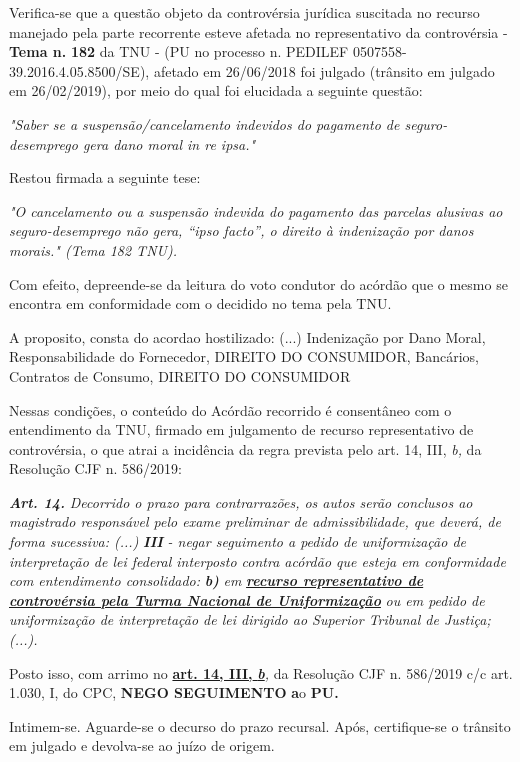 \documentclass[12pt]{article}
\begin{document}
\justifying
\noindent Verifica-se que a questão objeto da controvérsia jurídica suscitada no recurso manejado pela parte recorrente esteve afetada no representativo da controvérsia - \textbf{Tema n. }\textbf{182} da TNU - (PU no processo n. PEDILEF 0507558-39.2016.4.05.8500/SE),  afetado em 26/06/2018 foi julgado (trânsito em julgado em 26/02/2019), por meio do qual foi elucidada a seguinte questão:

\noindent \textit{"Saber se a suspensão/cancelamento indevidos do pagamento de seguro-desemprego gera dano moral in re ipsa."}

\noindent Restou firmada a seguinte tese:

\noindent \textit{"O cancelamento ou a suspensão indevida do pagamento das parcelas alusivas ao seguro-desemprego não gera, “ipso facto”, o direito à indenização por danos morais." (Tema 182 TNU).}

\noindent Com efeito, depreende-se da leitura do voto condutor do acórdão que o mesmo se encontra em conformidade com o decidido no  tema pela TNU.

\noindent A proposito, consta do acordao hostilizado: (...) Indenização por Dano Moral, Responsabilidade do Fornecedor, DIREITO DO CONSUMIDOR, Bancários, Contratos de Consumo, DIREITO DO CONSUMIDOR

\noindent Nessas condições, o conteúdo do Acórdão recorrido é consentâneo com o entendimento da TNU, firmado em julgamento de recurso representativo de controvérsia, o que atrai a incidência da regra prevista pelo art. 14, III, \textit{b,} da Resolução CJF n. 586/2019:

\noindent \textit{\textbf{Art. 14.}}\textit{ Decorrido o prazo para contrarrazões, os autos serão conclusos ao magistrado responsável pelo exame preliminar de admissibilidade, que deverá, de forma sucessiva: (...) }\textit{\textbf{III }}\textit{- negar seguimento a pedido de uniformização de interpretação de lei federal interposto contra acórdão que esteja em conformidade com entendimento consolidado: }\textit{\textbf{b)}}\textit{ em }\uline{\textit{\textbf{recurso representativo de controvérsia pela Turma Nacional de Uniformização}}}\textit{ ou em pedido de uniformização de interpretação de lei dirigido ao Superior Tribunal de Justiça;(...).}

\noindent Posto isso, com arrimo no \uline{\textbf{art. 14, III, }}\uline{\textit{\textbf{b}}}\textit{,} da Resolução CJF n. 586/2019 c/c art. 1.030, I, do CPC, \textbf{NEGO SEGUIMENTO }\textbf{a}o\textbf{ PU}\textbf{.}

\noindent Intimem-se. Aguarde-se o decurso do prazo recursal. Após, certifique-se o trânsito em julgado e devolva-se ao juízo de origem.
\end{document}
